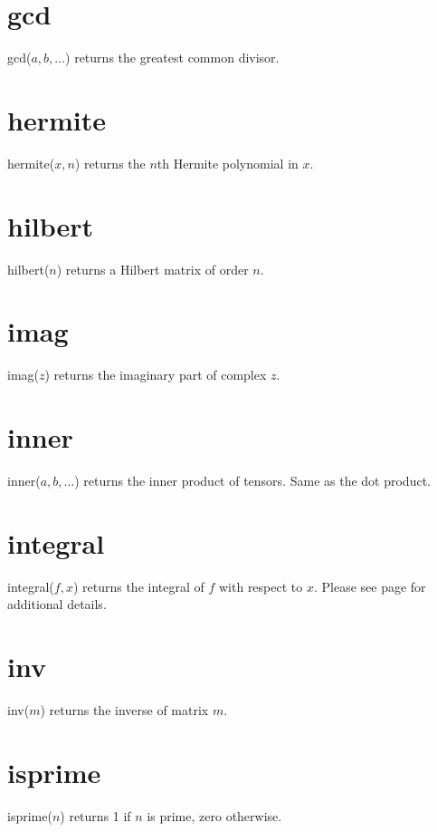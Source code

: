 \documentclass[12pt,openany]{report}
\begin{document}
\section*{gcd}
gcd($a,b,\ldots$) returns the greatest common divisor.

\section*{hermite}
hermite($x,n$) returns the $n$th Hermite polynomial in $x$.

\section*{hilbert}
hilbert($n$) returns a Hilbert matrix of order $n$.

\section*{imag}
imag($z$) returns the imaginary part of complex $z$.

\section*{inner}
inner($a,b,\ldots$) returns the inner product of tensors.
Same as the dot product.

\section*{integral}
integral($f,x$) returns the integral of $f$ with respect to $x$.
Please see page \pageref{integral} for additional details.

\section*{inv}
inv($m$) returns the inverse of matrix $m$.

\section*{isprime}
isprime($n$) returns 1 if $n$ is prime, zero otherwise.
\end{document}
